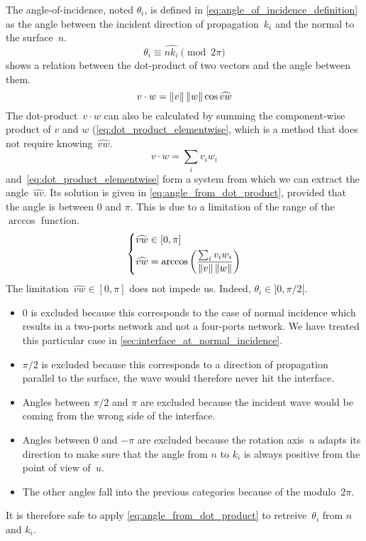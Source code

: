 The angle-of-incidence, noted $\theta_i$, is defined in \cref{eq:angle_of_incidence_definition} as the angle between the incident direction of propagation~$k_i$ and the normal to the surface~$n$.
\begin{equation}
    \theta_i \equiv \widehat{n k_i} \pmod{2\pi}
    \label{eq:angle_of_incidence_definition}
\end{equation}
 shows a relation between the dot-product of two vectors and the angle between them.
\begin{equation}
    v \cdot w = \left\| v \right\| \left\| w \right\| \cos \widehat{vw}
    \label{eq:dot_product_cos}
\end{equation}
The dot-product~$v \cdot w$ can also be calculated by summing the component-wise product of $v$ and $w$ (\cref{eq:dot_product_elementwise}, which is a method that does not require knowing~$\widehat{vw}$.
\begin{equation}
    v \cdot w = \sum_i v_i w_i
    \label{eq:dot_product_elementwise}
\end{equation}
 and~\cref{eq:dot_product_elementwise} form a system from which we can extract the angle~$\widehat{uv}$.
Its solution is given in \cref{eq:angle_from_dot_product}, provided that the angle is between 0 and $\pi$.
This is due to a limitation of the range of the $\arccos$ function.
\begin{equation}
    \left\lbrace
        \begin{aligned}
            \widehat{vw} &\in [0, \pi]
            \\
            \widehat{vw} &= \arccos
            \left(
                \frac{
                    \sum_i v_i w_i
                }{
                    \left\| v \right\| \left\| w \right\|
                }
            \right)
        \end{aligned}
    \right.
    \label{eq:angle_from_dot_product}
\end{equation}
The limitation~$\widehat{vw} \in [0, \pi]$ does not impede us.
Indeed, $\theta_i \in ]0, \pi/2[$.
\begin{itemize}
    \item 0 is excluded because this corresponds to the case of normal incidence which results in a two-ports network and not a four-ports network.  We have treated this particular case in \vref{sec:interface_at_normal_incidence}.
    \item $\pi/2$ is excluded because this corresponds to a direction of propagation parallel to the surface, the wave would therefore never hit the interface.
    \item Angles between $\pi/2$ and $\pi$ are excluded because the incident wave would be coming from the wrong side of the interface.
    \item Angles between 0 and $-\pi$ are excluded because the rotation axis~$u$ adapts its direction to make sure that the angle from $n$ to $k_i$ is always positive from the point of view of~$u$.
    \item The other angles fall into the previous categories because of the modulo~$2\pi$.
\end{itemize}
It is therefore safe to apply \cref{eq:angle_from_dot_product} to retreive~$\theta_i$ from $n$ and $k_i$.

